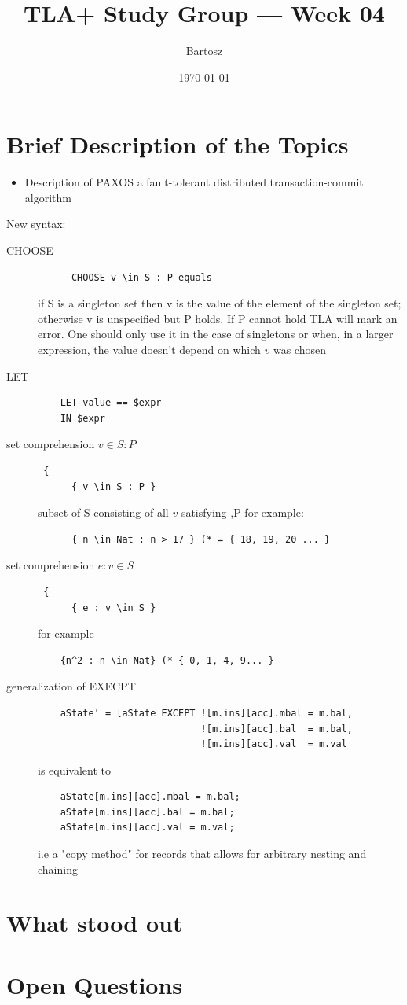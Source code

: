 \documentclass[11pt]{article}
\title{TLA+ Study Group — Week 04}
\author{Bartosz}
\date{\today}
\begin{document}
\maketitle

\section*{Brief Description of the Topics}

\begin{itemize}
  \item { Description of PAXOS a fault-tolerant distributed transaction-commit algorithm }
\end{itemize}

New syntax:
\begin{description}
  \item[CHOOSE] { 
    \begin{verbatim}
      CHOOSE v \in S : P equals
    \end{verbatim}
    if S is a singleton set then v is the value of the element of the singleton
    set; otherwise v is unspecified but P holds. If P cannot hold TLA will mark
    an error. One should only use it in the case of singletons or when, in a
    larger expression, the value doesn't depend on which $v$ was chosen
  }
  \item[LET] { 
    \begin{verbatim}
    LET value == $expr
    IN $expr
    \end{verbatim}
  }
  \item[set comprehension $v \in S : P$] {
    \begin{verbatim} {
      { v \in S : P }
    \end{verbatim}
    subset of S consisting of all $v$ satisfying ,P for example:
    \begin{verbatim}
      { n \in Nat : n > 17 } (* = { 18, 19, 20 ... }
    \end{verbatim}
  }
  \item[set comprehension $e : v \in S$] {
    \begin{verbatim} {
      { e : v \in S }
    \end{verbatim}
    for example
    \begin{verbatim}
    {n^2 : n \in Nat} (* { 0, 1, 4, 9... }
    \end{verbatim}
  }
  \item[generalization of EXECPT] {
    \begin{verbatim}
    aState' = [aState EXCEPT ![m.ins][acc].mbal = m.bal,
                             ![m.ins][acc].bal  = m.bal,
                             ![m.ins][acc].val  = m.val
    \end{verbatim}
    is equivalent to
    \begin{verbatim}
    aState[m.ins][acc].mbal = m.bal;
    aState[m.ins][acc].bal = m.bal;
    aState[m.ins][acc].val = m.val;
    \end{verbatim}

    i.e a "copy method" for records that allows for arbitrary nesting and
    chaining
  }
\end{description}

\section*{What stood out}


\section*{Open Questions}
\end{document}
